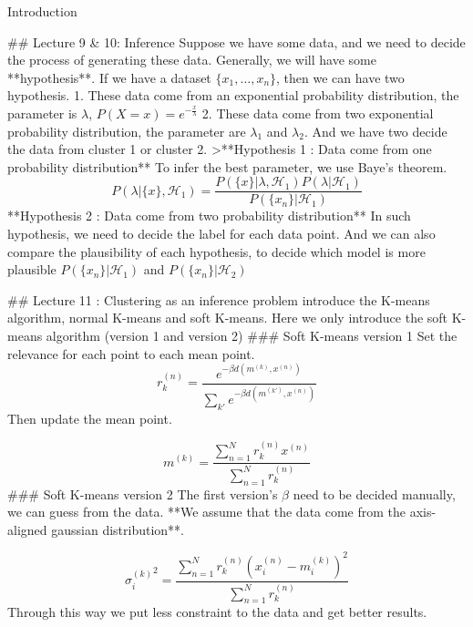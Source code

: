 \documentclass{beamer}
\begin{document}
\begin{frame}[allowframebreaks]{Introduction}
    
    ## Lecture 9 & 10: Inference
    Suppose we have some data, and we need to decide the process of generating these data. Generally, we will have some **hypothesis**. If we have a dataset $\{x_1,\dots,{x_n}\}$, then we can have two hypothesis. 
    1. These data come from an exponential probability distribution, the parameter is $\lambda$, $P(X=x)=e^{-\frac{x}{\lambda}}$
    2. These data come from two exponential probability distribution, the parameter are $\lambda_1$ and $\lambda_2$. And we have two decide the data from cluster 1 or cluster 2. 
    >**Hypothesis 1 : Data come from one probability distribution**
    To infer the best parameter, we use Baye's theorem.
    $$P(\lambda|\{x\}, \mathcal{H}_1)=\frac{P(\{x\}|\lambda,\mathcal{H}_1)P(\lambda|\mathcal{H}_1)}{P(\{x_n\}|\mathcal{H}_1)}$$
    **Hypothesis 2 : Data come from two probability distribution**
    In such hypothesis, we need to decide the label for each data point.
    And we can also compare the plausibility of each hypothesis, to decide which model is more plausible $P(\{x_n\}|\mathcal{H}_1)$ and $P(\{x_n\}|\mathcal{H}_2)$
    
    ## Lecture 11 : Clustering as an inference problem
    introduce the K-means algorithm, normal K-means and soft K-means.
    Here we only introduce the soft K-means algorithm (version 1 and version 2)
    ### Soft K-means version 1
    Set the relevance for each point to each mean point.
    \begin{equation*}
    r^{( n)}_{k} =\frac{e^{-\beta d\left( m^{( k)} ,x^{( n)}\right)}}{\sum _{k'} e^{-\beta d\left( m^{( k')} ,x^{( n)}\right)}}
    \end{equation*}
    Then update the mean point. 
    
    \begin{equation*}
    m^{( k)} =\frac{\sum ^{N}_{n=1} r^{( n)}_{k} x^{( n)}}{\sum ^{N}_{n=1} r^{( n)}_{k}}
    \end{equation*}
    ### Soft K-means version 2
    The first version's $\beta $ need to be decided manually, we can guess from the data. **We assume that the data come from the axis-aligned gaussian distribution**.
    
    \begin{equation*}
    {\sigma ^{( k)}_{i}}^{2} =\frac{\sum ^{N}_{n=1} r^{( n)}_{k}\left( x^{( n)}_{i} -m^{( k)}_{i}\right)^{2}}{\sum ^{N}_{n=1} r^{( n)}_{k}}
    \end{equation*}
    Through this way we put less constraint to the data and get better results.
    

\end{frame}
\end{document}
